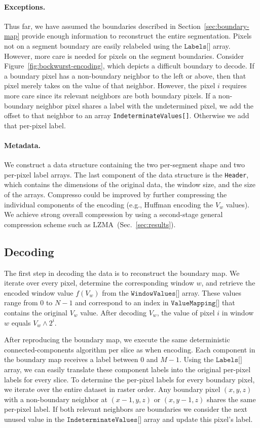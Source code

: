 \paragraph{Exceptions.}

Thus far, we have assumed the boundaries described in Section~\ref{sec:boundary-map} provide enough information to reconstruct the entire segmentation.
Pixels not on a segment boundary are easily relabeled using the $\texttt{Labels[]}$ array. 
However, more care is needed for pixels on the segment boundaries. 
Consider Figure~\ref{fig:bockwurst-encoding}, which depicts a difficult boundary to decode. 
If a boundary pixel has a non-boundary neighbor to the left or above, then that pixel merely takes on the value of that neighbor. 
However, the pixel $i$ requires more care since its relevant neighbors are both boundary pixels. 
If a non-boundary neighbor pixel shares a label with the undetermined pixel, we add the offset to that neighbor to an array \texttt{IndeterminateValues[]}. 
Otherwise we add that per-pixel label.

\paragraph{Metadata.}

We construct a data structure containing the two per-segment shape and two per-pixel label arrays. The last component of the data structure is the \texttt{Header}, which contains the dimensions of the original data, the window size, and the size of the arrays. Compresso could be improved by further compressing the individual components of the encoding (e.g., Huffman encoding the $V_w$ values). We achieve strong overall compression by using a second-stage general compression scheme such as LZMA~(Sec.~\ref{sec:results}).


\subsection{Decoding}

The first step in decoding the data is to reconstruct the boundary map. We iterate over every pixel, determine the corresponding window $w$, and retrieve the encoded window value $f(V_w)$ from the $\texttt{WindowValues[]}$ array. These values range from $0$ to $N - 1$ and correspond to an index in $\texttt{ValueMapping[]}$ that contains the original $V_w$ value. After decoding $V_w$, the value of pixel $i$ in window $w$ equals $V_w \land 2^i$.

After reproducing the boundary map, we execute the same deterministic connected-components algorithm per slice as when encoding. Each component in the boundary map receives a label between $0$ and $M - 1$. Using the $\texttt{Labels[]}$ array, we can easily translate these component labels into the original per-pixel labels for every slice. To determine the per-pixel labels for every boundary pixel, we iterate over the entire dataset in raster order. Any boundary pixel $(x, y, z)$ with a non-boundary neighbor at $(x - 1, y, z)$ or $(x, y - 1, z)$ shares the same per-pixel label. If both relevant neighbors are boundaries we consider the next unused value in the $\texttt{IndeterminateValues[]}$ array and update this pixel's label.



